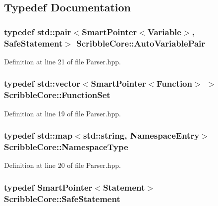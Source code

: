 \subsection{Typedef Documentation}
\hypertarget{namespace_scribble_core_a6c19e97eb8a6427c1f921de9e13fd534}{
\subsubsection[{Auto\-Variable\-Pair}]{\setlength{\rightskip}{0pt plus 5cm}typedef std\-::pair$<${\bf Smart\-Pointer}$<${\bf Variable}$>$, {\bf Safe\-Statement}$>$ {\bf Scribble\-Core\-::\-Auto\-Variable\-Pair}}}\label{namespace_scribble_core_a6c19e97eb8a6427c1f921de9e13fd534}


Definition at line 21 of file Parser.\-hpp.

\hypertarget{namespace_scribble_core_a9e40b3081eb67f0c92c1d1d5041495cf}{
\subsubsection[{Function\-Set}]{\setlength{\rightskip}{0pt plus 5cm}typedef std\-::vector$<${\bf Smart\-Pointer}$<${\bf Function}$>$ $>$ {\bf Scribble\-Core\-::\-Function\-Set}}}\label{namespace_scribble_core_a9e40b3081eb67f0c92c1d1d5041495cf}


Definition at line 19 of file Parser.\-hpp.

\hypertarget{namespace_scribble_core_acf9f6e70f7e422fafa73920c31cff3cb}{
\subsubsection[{Namespace\-Type}]{\setlength{\rightskip}{0pt plus 5cm}typedef std\-::map$<$std\-::string, {\bf Namespace\-Entry}$>$ {\bf Scribble\-Core\-::\-Namespace\-Type}}}\label{namespace_scribble_core_acf9f6e70f7e422fafa73920c31cff3cb}


Definition at line 20 of file Parser.\-hpp.

\hypertarget{namespace_scribble_core_a2ad5bf236bc9164cb56f564685f15a11}{
\subsubsection[{Safe\-Statement}]{\setlength{\rightskip}{0pt plus 5cm}typedef {\bf Smart\-Pointer}$<${\bf Statement}$>$ {\bf Scribble\-Core\-::\-Safe\-Statement}}}\label{namespace_scribble_core_a2ad5bf236bc9164cb56f564685f15a11}


